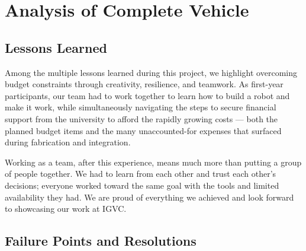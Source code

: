 \documentclass[12pt, letterpaper]{article}
\begin{document}
\section{Analysis of Complete Vehicle}
\label{sec:analysis}

\subsection{Lessons Learned}

Among the multiple lessons learned during this project, we highlight overcoming budget
constraints through creativity, resilience, and teamwork. As first-year participants,
our team had to work together to learn how to build a robot and make it work, while
simultaneously navigating the steps to secure financial support from the university to
afford the rapidly growing costs --- both the planned budget items and the many
unaccounted-for expenses that surfaced during fabrication and integration.

Working as a team, after this experience, means much more than putting a group of
people together. We had to learn from each other and trust each other's decisions;
everyone worked toward the same goal with the tools and limited availability they had.
We are proud of everything we achieved and look forward to showcasing our work at IGVC.

\subsection{Failure Points and Resolutions}
\end{document}
